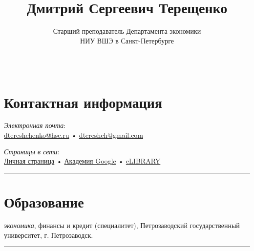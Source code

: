 \documentclass[10pt]{article}
\title{\bfseries\Huge Дмитрий Сергеевич Терещенко}
\author{Старший преподаватель Департамента экономики\\НИУ ВШЭ в Санкт-Петербурге}
\date{}
\newcommand{\years}[1]{\marginnote{\scriptsize #1}}
\begin{document}
\maketitle

\hrule
\section*{Контактная информация}
\noindent

	\textit{Электронная почта}: \\
	\href{mailto:dtereshchenko@hse.ru}{dtereshchenko@hse.ru}  • 
	\href{mailto:dtereshch@gmail.com}{dtereshch@gmail.com}\\
	
	\vspace{0.5em}

	\textit{Страницы в сети}: \\
	\href{https://www.hse.ru/staff/dtereshch}{Личная страница}  •
	\href{https://petrsu.ru/persons/2529/teretshenko}{Академия Google} •
	\href{https://elibrary.ru/author_items.asp?authorid=640419&pubrole=100&show_refs=1&show_option=0}{eLIBRARY}


\vspace{2em}
\hrule




\section*{Образование}
\noindent
\years{2005-2010}\textit{экономика}, финансы и кредит (специалитет), Петрозаводский государственный университет, г. Петрозаводск. \\

\vspace{2em}
\hrule
\end{document}
